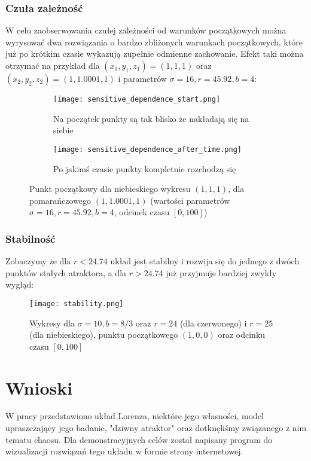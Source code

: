 \documentclass[12pt]{report}
\begin{document}
		\subsection{Czuła zależność}
		W celu zaobserwowania czułej zależności od warunków początkowych można wyrysować dwa rozwiązania o bardzo zbliżonych warunkach początkowych, które już po krótkim czasie wykazują zupełnie odmienne zachowanie. Efekt taki można otrzymać na przykład dla $(x_1, y_1, z_1) = (1, 1, 1)$ oraz $(x_2, y_2, z_2) = (1, 1.0001, 1)$ i parametrów $\sigma = 16, r = 45.92, b = 4$:
		\begin{figure}[H]
			\centering
			\begin{subfigure}[b]{0.49\textwidth}
				\texttt{[image: sensitive\_dependence\_start.png]}
				\caption{Na początek punkty są tak blisko że nakładają się na siebie}
			\end{subfigure}
			\begin{subfigure}[b]{0.49\textwidth}
				\texttt{[image: sensitive\_dependence\_after\_time.png]}
				\caption{Po jakimś czasie punkty kompletnie rozchodzą się}
			\end{subfigure}
			\caption{Punkt początkowy dla niebieskiego wykresu $(1, 1, 1)$, dla pomarańczowego $(1, 1.0001, 1)$ (wartości parametrów $\sigma = 16, r = 45.92, b = 4$, odcinek czasu $[0, 100]$)}
			\label{fig:sensitive_dependence}
		\end{figure}

		\subsection{Stabilność}
		Zobaczymy że dla $r < 24.74$ układ jest stabilny i rozwija się do jednego z dwóch punktów stałych atraktora, a dla $r > 24.74$ już przyjmuje bardziej zwykły wygląd:
		\begin{figure}[H]
			\centering
			\texttt{[image: stability.png]}
			\caption{Wykresy dla $\sigma = 10, b = 8/3$ oraz $r = 24$ (dla czerwonego) i $r = 25$ (dla niebieskiego), punktu początkowego $(1, 0, 0)$ oraz odcinku czasu $[0, 100]$}
			\label{fig:stability}
		\end{figure}

\chapter{Wnioski}
	\par W pracy przedstawiono układ Lorenza, niektóre jego własności, model upraszczający jego badanie, "dziwny atraktor" oraz dotknęliśmy związanego z nim tematu chaosu. Dla demonstracyjnych celów został napisany program do wizualizacji rozwiązań tego układu w formie strony internetowej.
	
\end{document}
